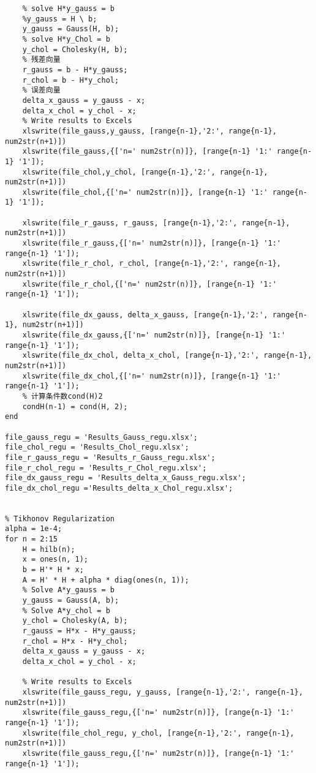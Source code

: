 \documentclass[a4paper]{article}
\begin{document}
\begin{CJK*}{GBK}{song}
\begin{enumerate}[(1)]
\begin{lstlisting}
    % solve H*y_gauss = b
    %y_gauss = H \ b;
    y_gauss = Gauss(H, b);
    % solve H*y_Chol = b
    y_chol = Cholesky(H, b);
    % 残差向量
    r_gauss = b - H*y_gauss;
    r_chol = b - H*y_chol;
    % 误差向量
    delta_x_gauss = y_gauss - x;
    delta_x_chol = y_chol - x;
    % Write results to Excels
    xlswrite(file_gauss,y_gauss, [range{n-1},'2:', range{n-1}, num2str(n+1)])
    xlswrite(file_gauss,{['n=' num2str(n)]}, [range{n-1} '1:' range{n-1} '1']);
    xlswrite(file_chol,y_chol, [range{n-1},'2:', range{n-1}, num2str(n+1)])
    xlswrite(file_chol,{['n=' num2str(n)]}, [range{n-1} '1:' range{n-1} '1']);

    xlswrite(file_r_gauss, r_gauss, [range{n-1},'2:', range{n-1}, num2str(n+1)])
    xlswrite(file_r_gauss,{['n=' num2str(n)]}, [range{n-1} '1:' range{n-1} '1']);
    xlswrite(file_r_chol, r_chol, [range{n-1},'2:', range{n-1}, num2str(n+1)])
    xlswrite(file_r_chol,{['n=' num2str(n)]}, [range{n-1} '1:' range{n-1} '1']);

    xlswrite(file_dx_gauss, delta_x_gauss, [range{n-1},'2:', range{n-1}, num2str(n+1)])
    xlswrite(file_dx_gauss,{['n=' num2str(n)]}, [range{n-1} '1:' range{n-1} '1']);
    xlswrite(file_dx_chol, delta_x_chol, [range{n-1},'2:', range{n-1}, num2str(n+1)])
    xlswrite(file_dx_chol,{['n=' num2str(n)]}, [range{n-1} '1:' range{n-1} '1']);
    % 计算条件数cond(H)2
    condH(n-1) = cond(H, 2);
end

file_gauss_regu = 'Results_Gauss_regu.xlsx';
file_chol_regu = 'Results_Chol_regu.xlsx';
file_r_gauss_regu = 'Results_r_Gauss_regu.xlsx';
file_r_chol_regu = 'Results_r_Chol_regu.xlsx';
file_dx_gauss_regu = 'Results_delta_x_Gauss_regu.xlsx';
file_dx_chol_regu ='Results_delta_x_Chol_regu.xlsx';


% Tikhonov Regularization
alpha = 1e-4;
for n = 2:15
    H = hilb(n);
    x = ones(n, 1);
    b = H'* H * x;
    A = H' * H + alpha * diag(ones(n, 1));
    % Solve A*y_gauss = b
    y_gauss = Gauss(A, b);
    % Solve A*y_chol = b
    y_chol = Cholesky(A, b);
    r_gauss = H*x - H*y_gauss;
    r_chol = H*x - H*y_chol;
    delta_x_gauss = y_gauss - x;
    delta_x_chol = y_chol - x;

    % Write results to Excels
    xlswrite(file_gauss_regu, y_gauss, [range{n-1},'2:', range{n-1}, num2str(n+1)])
    xlswrite(file_gauss_regu,{['n=' num2str(n)]}, [range{n-1} '1:' range{n-1} '1']);
    xlswrite(file_chol_regu, y_chol, [range{n-1},'2:', range{n-1}, num2str(n+1)])
    xlswrite(file_gauss_regu,{['n=' num2str(n)]}, [range{n-1} '1:' range{n-1} '1']);


\end{lstlisting}
\end{enumerate}
\end{CJK*}
\end{document}
